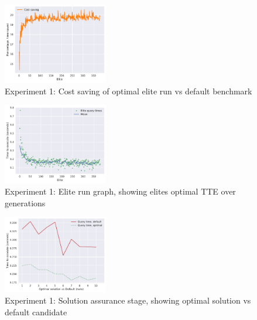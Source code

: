\documentclass[a4paper,english]{report}
\begin{document}
	\begin{figure}[H]
		\centering
		\includegraphics[width=130pt]{runlogs/final1/2}
		\caption{Experiment 1: Cost saving of optimal elite run vs default benchmark}
		\label{fig:final12}
	\end{figure}
	\begin{figure}[H]
		\centering
		\includegraphics[width=130pt]{runlogs/final1/3}
		\caption{Experiment 1: Elite run graph, showing elites optimal TTE over generations}
		\label{fig:final13}
	\end{figure}
	\begin{figure}[H]
		\centering
		\includegraphics[width=130pt]{runlogs/final1/4}
		\caption{Experiment 1: Solution assurance stage, showing optimal solution vs default candidate}
		\label{fig:final14}
	\end{figure}
	\clearpage
\end{document}
